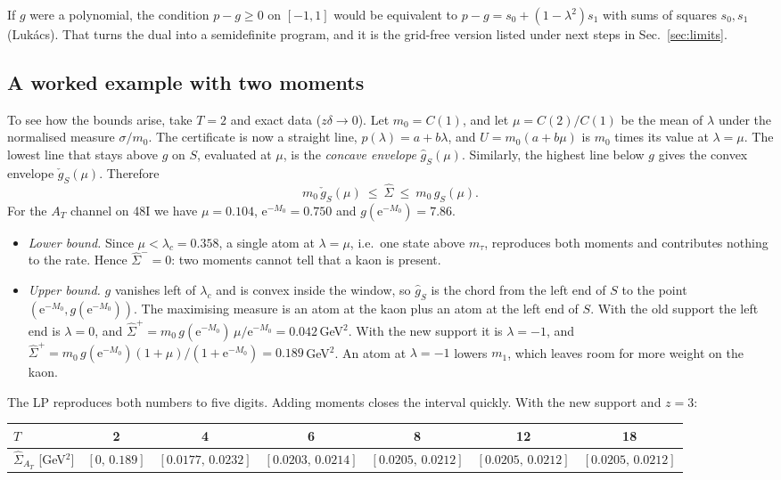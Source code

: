 \documentclass[11pt]{article}
\newcommand{\ee}{\mathrm{e}}
\theoremstyle{remark}
\begin{document}
If $g$ were a polynomial, the condition $p-g\ge0$ on $[-1,1]$ would be equivalent to $p-g=s_0+(1-\lambda^2)s_1$ with sums of squares $s_0,s_1$ (Luk\'acs).
That turns the dual into a semidefinite program, and it is the grid-free version listed under next steps in Sec.~\ref{sec:limits}.

\subsection{A worked example with two moments}\label{sec:toy}
To see how the bounds arise, take $T=2$ and exact data ($z\delta\to0$). Let $m_0=C(1)$, and let $\mu=C(2)/C(1)$ be the mean of $\lambda$ under the normalised measure $\sigma/m_0$.
The certificate is now a straight line, $p(\lambda)=a+b\lambda$, and $U=m_0(a+b\mu)$ is $m_0$ times its value at $\lambda=\mu$. The lowest line that stays above $g$ on $S$, evaluated at $\mu$,
is the \emph{concave envelope} $\hat g_S(\mu)$. Similarly, the highest line below $g$ gives the convex envelope $\check g_S(\mu)$. Therefore
\begin{equation}
 m_0\,\check g_S(\mu)\ \le\ \hat\Sigma\ \le\ m_0\,\hat g_S(\mu).
\end{equation}
For the $A_T$ channel on 48I we have $\mu=0.104$, $\ee^{-M_0}=0.750$ and $g(\ee^{-M_0})=7.86$.
\begin{itemize}[leftmargin=*,itemsep=1pt]
\item \emph{Lower bound.} Since $\mu<\lambda_c=0.358$, a single atom at $\lambda=\mu$, i.e.\ one state above $m_\tau$, reproduces both moments and contributes nothing to the rate. Hence $\hat\Sigma^-=0$:
      two moments cannot tell that a kaon is present.
\item \emph{Upper bound.} $g$ vanishes left of $\lambda_c$ and is convex inside the window, so $\hat g_S$ is the chord from the left end of $S$ to the point $(\ee^{-M_0},g(\ee^{-M_0}))$.
      The maximising measure is an atom at the kaon plus an atom at the left end of $S$. With the old support the left end is $\lambda=0$, and $\hat\Sigma^+=m_0\,g(\ee^{-M_0})\,\mu/\ee^{-M_0}=0.042$\,GeV$^2$.
      With the new support it is $\lambda=-1$, and $\hat\Sigma^+=m_0\,g(\ee^{-M_0})(1+\mu)/(1+\ee^{-M_0})=0.189$\,GeV$^2$.
      An atom at $\lambda=-1$ lowers $m_1$, which leaves room for more weight on the kaon.
\end{itemize}
The LP reproduces both numbers to five digits. Adding moments closes the interval quickly. With the new support and $z=3$:
\begin{center}\footnotesize\setlength{\tabcolsep}{3pt}
\begin{tabular}{lcccccc}
\toprule
$T$ & 2 & 4 & 6 & 8 & 12 & 18\\
\midrule
$\hat\Sigma_{A_T}$ [GeV$^2$] & $[0,\,0.189]$ & $[0.0177,\,0.0232]$ & $[0.0203,\,0.0214]$ & $[0.0205,\,0.0212]$ & $[0.0205,\,0.0212]$ & $[0.0205,\,0.0212]$\\
\bottomrule
\end{tabular}
\end{center}
\end{document}
